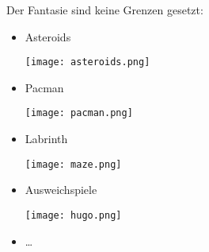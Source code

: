 \documentclass[
  accentcolor=tud1c,	%
  colorbacktitle,		%
  inverttitle,			%
  german,				%
  twoside
]{tudexercise}
\begin{document}
Der Fantasie sind keine Grenzen gesetzt:

\begin{itemize}
\item Asteroids\\
\begin{center}\texttt{[image: asteroids.png]}\end{center}
\item Pacman\\
\begin{center}\texttt{[image: pacman.png]}\end{center}
\item Labrinth
\begin{center}\texttt{[image: maze.png]}\end{center}
\item \glqq Ausweichspiele\grqq{} 
\begin{center}\texttt{[image: hugo.png]}\end{center}
\item \dots
\end{itemize}
\end{document}
